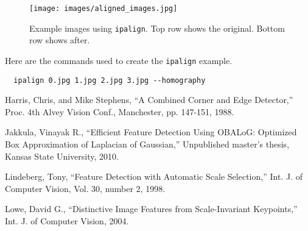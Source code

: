 \begin{figure}[h]
\begin{center}
  \texttt{[image: images/aligned\_images.jpg]}
\end{center}
\caption{Example images using {\tt ipalign}. Top row shows the original. Bottom row shows after.}
\label{fig:align_demo}
\end{figure}

Here are the commands used to create the {\tt ipalign} example.

\begin{verbatim}
  ipalign 0.jpg 1.jpg 2.jpg 3.jpg --homography
\end{verbatim}

\begin{thebibliography}{1}

 Harris, Chris, and Mike Stephens, ``A Combined
  Corner and Edge Detector,'' Proc. 4th Alvey Vision Conf., Manchester,
  pp. 147-151, 1988.

 Jakkula, Vinayak R., ``Efficient Feature Detection Using OBALoG: Optimized Box Approximation of Laplacian of Gaussian,'' Unpublished master's thesis, Kansas State University, 2010.

 Lindeberg, Tony, ``Feature Detection with Automatic
  Scale Selection,''  Int. J. of Computer Vision, Vol. 30, number 2,
  1998.

 Lowe, David G., ``Distinctive Image Features from
  Scale-Invariant Keypoints,'' Int. J. of Computer Vision, 2004.

\end{thebibliography}

